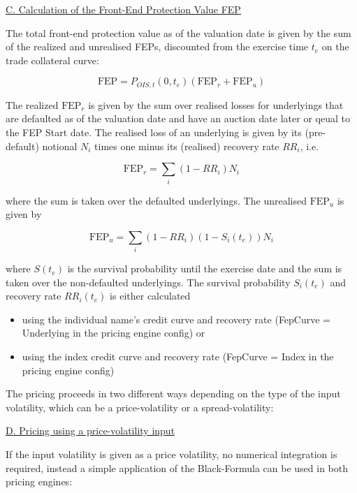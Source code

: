 \underline{C. Calculation of the Front-End Protection Value FEP}

The total front-end protection value as of the valuation date is given by the sum of the realized and unrealised FEPs,
discounted from the exercise time $t_e$ on the trade collateral curve:

\begin{equation}
\text{FEP} = P_{OIS,t}(0,t_e) ( \text{FEP}_r + \text{FEP}_u )
\end{equation}

The realized $\text{FEP}_r$ is given by the sum over realised losses for underlyings that are defaulted as of the valuation
date and have an auction date later or qeual to the FEP Start date. The realised loss of an underlying is given by its
(pre-default) notional $N_i$ times one minus its (realised) recovery rate $RR_i$, i.e.

\begin{equation}
\text{FEP}_r = \sum_i (1-RR_i) N_i
\end{equation}

where the sum is taken over the defaulted underlyings. The unrealised $\text{FEP}_u$ is given by

\begin{equation}
\text{FEP}_u = \sum_i (1-RR_i) (1 - S_i(t_e)) N_i
\end{equation}

where $S(t_e)$ is the survival probability until the exercise date and the sum is taken over the non-defaulted
underlyings. The survival probability $S_i(t_e)$ and recovery rate $RR_i(t_e)$ is either calculated

\begin{itemize}
\item using the individual name's credit curve and recovery rate (FepCurve = Underlying in the pricing engine config) or
\item using the index credit curve and recovery rate (FepCurve = Index in the pricing engine config)
\end{itemize}

The pricing proceeds in two different ways depending on the type of the input volatility, which can be a
price-volatility or a spread-volatility:

\underline{D. Pricing using a price-volatility input}

If the input volatility is given as a price volatility, no numerical integration is required, instead a simple
application of the Black-Formula can be used in both pricing engines:

